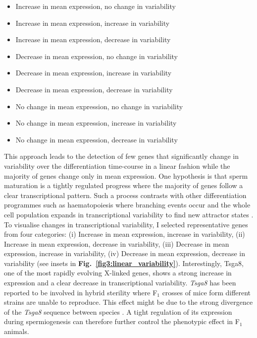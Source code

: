 \begin{itemize}
\itemsep0em 
\item Increase in mean expression, no change in variability
\item Increase in mean expression, increase in variability
\item Increase in mean expression, decrease in variability
\item Decrease in mean expression, no change in variability
\item Decrease in mean expression, increase in variability
\item Decrease in mean expression, decrease in variability
\item No change in mean expression, no change in variability
\item No change in mean expression, increase in variability
\item No change in mean expression, decrease in variability
\end{itemize}

This approach leads to the detection of few genes that significantly change in variability over the differentiation time-course in a linear fashion while the majority of genes change only in mean expression. 
One hypothesis is that sperm maturation is a tightly regulated progress where the majority of genes follow a clear transcriptional pattern. 
Such a process contrasts with other differentiation programmes such as haematopoiesis where branching events occur and the whole cell population expands in transcriptional variability to find new attractor states \citep{Mojtahedi2016}. 
To visualise changes in transcriptional variability, I selected representative genes from four categories: 
(i) Increase in mean expression, increase in variability, 
(ii) Increase in mean expression, decrease in variability, 
(iii) Decrease in mean expression, increase in variability, 
(iv) Decrease in mean expression, decrease in variability (see insets in \textbf{Fig.~\ref{fig3:linear_variability}}). 
Interestingly, \gls{Tsga8}, one of the most rapidly evolving X-linked genes, shows a strong increase in expression and a clear decrease in transcriptional variability. 
\emph{Tsga8} has been reported to be involved in hybrid sterility where F$_1$ crosses of mice form different strains are unable to reproduce. 
This effect might be due to the strong divergence of the \emph{Tsga8} sequence between species \citep{Good2011}. 
A tight regulation of its expression during spermiogenesis can therefore further control the phenotypic effect in F$_1$ animals.

